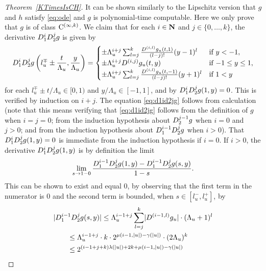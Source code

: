 \begin{proof}[Theorem~\ref{KTimesIsCH}]
It can be shown similarly to the Lipschitz version 
\cite[Theorem 3.2]{kawamura2010lipschitz}
that $g$ and $h$ satisfy \eqref{eq:ode} and $g$ is polynomial-time computable.
Here we only prove that $g$ is of class $\mathrm C^{(\infty, k)}$.
We claim that 
for each $i \in \mathbf N$ and $j \in \{0, \dots, k\}$, 
the derivative $D _1 ^i D _2 ^j g$ is given by 
\begin{equation}
   D_1^i D_2^j g \left(l^\mp_u \pm \frac{t}{\Lambda_u}, \frac{y}{\Lambda_u}\right)
   = \begin{cases}
      \pm \Lambda_u^{i+j} \sum^{k}_{l=j} \frac{D^{(i,l)} g_u(t,1)}{(l-j)!}
      (y - 1)^l &  \text{if } y < -1,
      \\
      \pm \Lambda_u^{i+j} D^{(i, j)} g_u(t, y) & \text{if } {-1} \le y \le 1,
      \\
      \pm \Lambda_u^{i+j} \sum^{k}_{l=j} 
      \frac{D^{(i,l)} g_u(t, -1)}{(l-j)!} (y + 1)^l &  \text{if } 1<y
    \end{cases}  \label{eq:d1id2jg}
\end{equation}
for each $l_u^\mp \pm t/\Lambda_u \in [0,1)$ and $y/\Lambda_u \in [-1, 1]$, 
and by $D _1 ^i D _2 ^j g (1, y) = 0$. 
This is verified by induction on $i + j$. 
The equation \eqref{eq:d1id2jg} follows from calculation 
(note that this means verifying 
that \eqref{eq:d1id2jg} follows from the definition of $g$ when $i = j = 0$; 
from the induction hypothesis about $D _2 ^{j - 1} g$ when $i = 0$ and $j > 0$; 
and from the induction hypothesis about $D _1 ^{i - 1} D _2 ^j g$ when $i > 0$).
That $D _1 ^i D _2 ^j g (1, y) = 0$ is 
immediate from the induction hypothesis if $i = 0$. 
If $i > 0$, the derivative
$D_1^i D_2^j g (1, y)$ is by definition the limit 
\begin{equation}
\lim_{s \to 1 - 0} \frac{D_1^{i-1} D_2^j g(1, y) - D_1^{i-1} D_2^j g (s, y)}{1 - s}.
\label{eq:limitofderivative}
\end{equation}
This can be shown to exist and equal $0$, 
by observing that the first term in the numerator is $0$
and the second term is bounded, when $s \in [l ^- _u, l ^+ _u]$, by 
 \begin{align}
&
  \lvert
   \D_1^{i-1} \D_2^j g (s, y)
  \rvert
  \le 
  \Lambda_u^{i-1+j} \sum^{k}_{l=j} \lvert \D^{(i-1,l)} g_u \rvert \cdot (\Lambda_u + 1)^l 
  \notag
\\
& \qquad
 \le
  \Lambda_u^{i-1+j}  \cdot k \cdot 2^{\mu(i-1, |u|) - \gamma(|u|)} \cdot (2\Lambda_u)^k
  \notag
\\
& \qquad
  \le 2^{(i-1+j+k)\lambda(|u|) + 2k + \mu(i-1, |u|)  - \gamma(|u|)}

\end{align}
\end{proof}
